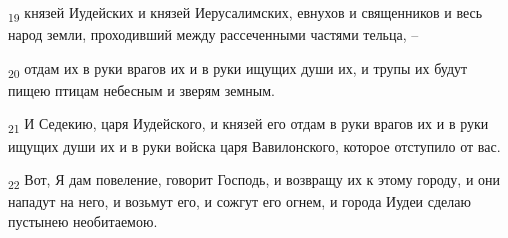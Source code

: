 \begin{tcolorbox}
\textsubscript{19} князей Иудейских и князей Иерусалимских, евнухов и священников и весь народ земли, проходивший между рассеченными частями тельца, --
\end{tcolorbox}
\begin{tcolorbox}
\textsubscript{20} отдам их в руки врагов их и в руки ищущих души их, и трупы их будут пищею птицам небесным и зверям земным.
\end{tcolorbox}
\begin{tcolorbox}
\textsubscript{21} И Седекию, царя Иудейского, и князей его отдам в руки врагов их и в руки ищущих души их и в руки войска царя Вавилонского, которое отступило от вас.
\end{tcolorbox}
\begin{tcolorbox}
\textsubscript{22} Вот, Я дам повеление, говорит Господь, и возвращу их к этому городу, и они нападут на него, и возьмут его, и сожгут его огнем, и города Иудеи сделаю пустынею необитаемою.
\end{tcolorbox}
